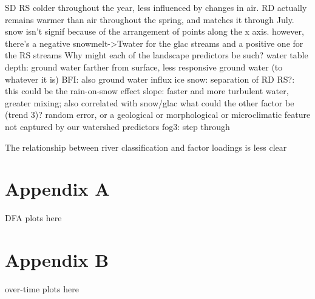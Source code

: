 \documentclass{article}
\begin{document}



    SD RS colder throughout the year, less influenced by changes in air.
    RD actually remains warmer than air throughout the spring, and matches it through July.
    snow isn't signif because of the arrangement of points along the x axis. however, there's a negative
        snowmelt->Twater for the glac streams and a positive one for the RS streams
    Why might each of the landscape predictors be such?
        water table depth: ground water farther from surface, less responsive ground water (to whatever it is)
        BFI: also ground water influx
        ice snow: separation of RD RS?: this could be the rain-on-snow effect
        slope: faster and more turbulent water, greater mixing; also correlated with snow/glac
    what could the other factor be (trend 3)? random error, or a geological or morphological or microclimatic feature not captured by our watershed predictors 
fog3: step through


The relationship between river classification and factor loadings is less clear

\section*{Appendix A}

DFA plots here

\section*{Appendix B}

over-time plots here
\end{document}
